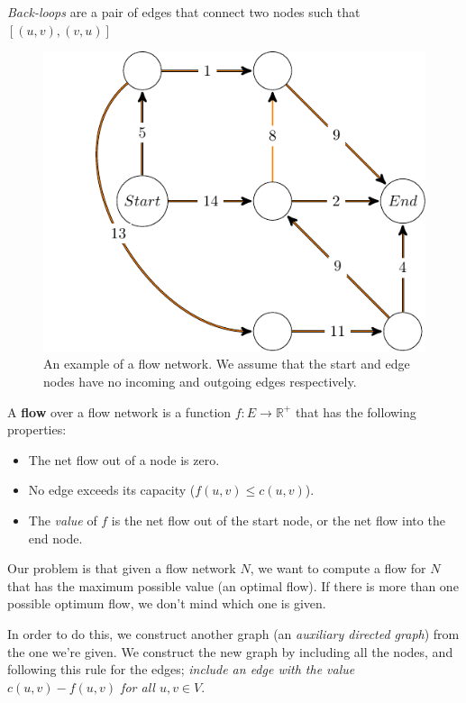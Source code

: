 \textit{Back-loops} are a pair of edges that connect two nodes such that
$[(u,v),(v,u)]$

\begin{figure}[H]
  \centering
  \includegraphics{diagrams/graph8}
  \caption{An example of a flow network. We assume that the start and edge 
    nodes have no incoming and outgoing edges respectively.}
  \label{fig:graph8}
\end{figure}

A \textbf{flow} over a flow network is a function $f : E \rightarrow
\mathbb{R^+}$ that has the following properties:

\begin{itemize}
  \item The net flow out of a node is zero.
  \item No edge exceeds its capacity ($f(u,v) \leq c(u,v)$).
  \item The \textit{value} of $f$ is the net flow out of the start node, or the
    net flow into the end node.
\end{itemize}

Our problem is that given a flow network $N$, we want to compute a flow for $N$
that has the maximum possible value (an optimal flow). If there is more than one
possible optimum flow, we don't mind which one is given.

In order to do this, we construct another graph (an \textit{auxiliary directed
graph}) from the one we're given. We construct the new graph by including all
the nodes, and following this rule for the edges; \textit{include an edge with
the value $c(u,v) - f(u,v)$ for all $u,v \in V$}.

